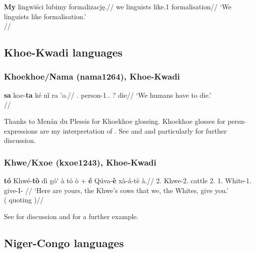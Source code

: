 \documentclass[A4paper]{article}
\begin{document}
\ex \begingl
\gla \textbf{My} lingwiści lubimy formalizację.//
\glb we linguists like.1\Pl{} formalisation//
\glft `We linguists like formalisation.'\\\citep[161f., (3b)]{rutkowski2002}//
\endgl
\xe


\subsection{Khoe-Kwadi languages}

\subsubsection{Khoekhoe/Nama (nama1264), Khoe-Kwadi}


\ex \begingl
\gla \textbf{sa} koe-\textbf{ta} ké n\~{i} ra \textdoublepipe{}'o.//
\glb \Art{}.\Addr{} person-1\Pl{}.\Incl{}.\Common{} \Top{}? \Compel{} \Prog{} die//
\glft `We humans have to die.' \\{\citep[after][133, (27b)]{boehm1985}}//
\endgl
\xe

Thanks to Menán du Plessis for Khoekhoe glossing. Khoekhoe glosses for \gls{persn}-expressions are my interpretation of \citet{haacke1977}.
See \citet[133--145]{boehm1985} and \citet[140]{maho1998} and particularly \citet{haacke1976, haacke1977, haacke2013namamorph} for further discussion. 

\subsubsection{Khwe/Kxoe (kxoe1243), Khoe-Kwadi}

\ex
\begingl
{} \textbf{tó} Khwé-\textbf{tò} dì gó\'{\textepsilon} à tó ò + \textbf{\textdoublepipe{}é} Qúva-\textbf{\textdoublepipe{}è} \textdoublebarpipe{}xà-á-tè à.//
\glb \Dem{} 2\Pl{}.\Common{} Khwe-2\Pl{}.\Common{} \Poss{} cattle \Obj{} 2\Pl{}.\Common{} \Poss{} 1\Pl{}.\M{} White-1\Pl{}.\M{} give-I-\Prs{} \Obj{}//
\glft `Here are yours, the Khwe's cows that we, the Whites, give you.' \\{(\citealp[41, (1)]{kilianhatz2008} quoting \citealp[514f.]{koehler1989})}//
\endgl
\xe

See \citet[ch. 3.1.2]{kilianhatz2008} for discussion and \citet[79]{kilianhatz2008} for a further example.

\subsection{Niger-Congo languages}
\end{document}
